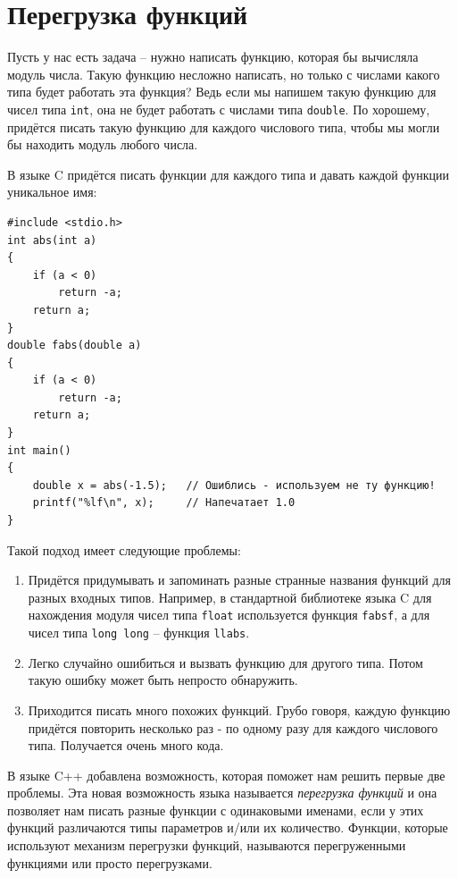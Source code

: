 \documentclass{article}
\begin{document}
\section*{Перегрузка функций}

Пусть у нас есть задача -- нужно написать функцию, которая бы вычисляла модуль числа. Такую функцию несложно написать, но только с числами какого типа будет работать эта функция? Ведь если мы напишем такую функцию для чисел типа \texttt{int}, она не будет работать с числами типа \texttt{double}. По хорошему, придётся писать такую функцию для каждого числового типа, чтобы мы могли бы находить модуль любого числа. 

В языке C придётся писать функции для каждого типа и давать каждой функции уникальное имя:
\begin{lstlisting}
#include <stdio.h>
int abs(int a)
{
    if (a < 0)
        return -a;
    return a;
}
double fabs(double a)
{
    if (a < 0)
        return -a;
    return a;
}
int main()
{
    double x = abs(-1.5);   // Ошиблись - используем не ту функцию!
    printf("%lf\n", x);     // Напечатает 1.0
}
\end{lstlisting}
Такой подход имеет следующие проблемы:

\begin{enumerate}
\item Придётся придумывать и запоминать разные странные названия функций для разных входных типов. Например, в стандартной библиотеке языка C для нахождения модуля чисел типа \texttt{float} используется функция \texttt{fabsf}, а для чисел типа \texttt{long long} -- функция \texttt{llabs}.

\item Легко случайно ошибиться и вызвать функцию для другого типа. Потом такую ошибку может быть непросто обнаружить.

\item Приходится писать много похожих функций. Грубо говоря, каждую функцию придётся повторить несколько раз - по одному разу для каждого числового типа. Получается очень много кода.
\end{enumerate}
В языке C++ добавлена возможность, которая поможет нам решить первые две проблемы. Эта новая возможность языка называется \textit{перегрузка функций} и она позволяет нам писать разные функции с одинаковыми именами, если у этих функций различаются типы параметров и/или их количество. Функции, которые используют механизм перегрузки функций, называются перегруженными функциями или просто перегрузками.
\end{document}
